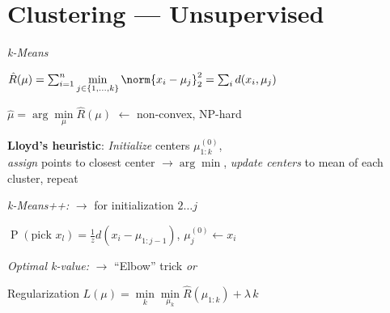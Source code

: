 \section{Clustering \textnormal{\sffamily --- Unsupervised}}

\emph{k-Means}

$\hat{R}(\mu) = \sum_{i=1}^n \min\limits_{j\in\{1,\ldots,k\}} \norm{x_i-\mu_j}_2^2 = \sum_i d(x_i,\mu_j)$

$\hat{\mu} =  \arg\!\min\limits_\mu \hat{R}(\mu)$ {\color{gray}$\leftarrow$ non-convex, NP-hard}\vspace{3pt}

\begin{highlightbox}
	\vspace{-3pt}
	\textbf{Lloyd's heuristic}: \textit{Initialize} centers $\mu_{1:k}^{(0)}$,\\
	\textit{assign} points to closest center {\small\color{gray} $\to \arg\min$},
	\textit{update centers} to mean of each cluster, repeat
\end{highlightbox}

\emph{k-Means++:}
\enskip $\to$ for initialization $2\ldots j$

$\operatorname{P}(\textrm{pick }x_l) = \frac{1}{z} d(x_i - \mu_{1:j-1})$, \enskip $\mu_j^{(0)} \leftarrow x_i$


\emph{Optimal \textit{k}-value:}
\enskip $\to$ ``Elbow'' trick \textit{or}

Regularization $L(\mu) = \min\limits_k \min\limits_{\mu_k} \hat R(\mu_{1:k}) + \lambda\,k$
